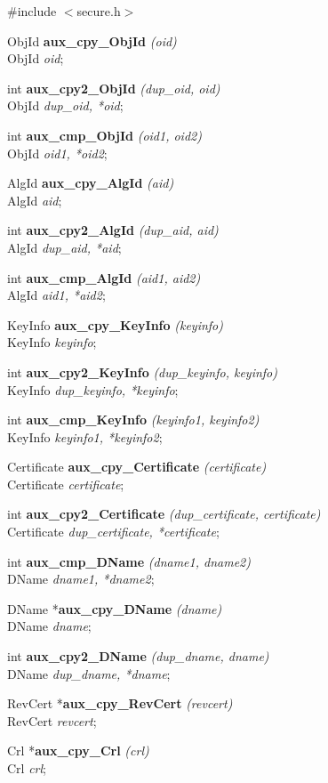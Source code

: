 \#include $<$secure.h$>$
 
ObjId {\bf *aux\_cpy\_ObjId} {\em (oid)} \\
ObjId {\em *oid};

int {\bf aux\_cpy2\_ObjId} {\em (dup\_oid, oid)} \\
ObjId {\em *dup\_oid, *oid};

int {\bf aux\_cmp\_ObjId} {\em (oid1, oid2)} \\
ObjId {\em *oid1, *oid2};

AlgId {\bf *aux\_cpy\_AlgId} {\em (aid)} \\
AlgId {\em *aid};

int {\bf aux\_cpy2\_AlgId} {\em (dup\_aid, aid)} \\
AlgId {\em *dup\_aid, *aid};

int {\bf aux\_cmp\_AlgId} {\em (aid1, aid2)} \\
AlgId {\em *aid1, *aid2};

KeyInfo {\bf *aux\_cpy\_KeyInfo} {\em (keyinfo)} \\
KeyInfo {\em *keyinfo};

int {\bf aux\_cpy2\_KeyInfo} {\em (dup\_keyinfo, keyinfo)} \\
KeyInfo {\em *dup\_keyinfo, *keyinfo};

int {\bf aux\_cmp\_KeyInfo} {\em (keyinfo1, keyinfo2)} \\
KeyInfo {\em *keyinfo1, *keyinfo2};

Certificate {\bf *aux\_cpy\_Certificate} {\em (certificate)} \\
Certificate {\em *certificate};

int {\bf aux\_cpy2\_Certificate} {\em (dup\_certificate, certificate)} \\
Certificate {\em *dup\_certificate, *certificate};

int {\bf aux\_cmp\_DName} {\em  (dname1, dname2)} \\
DName {\em *dname1, *dname2};

DName *{\bf aux\_cpy\_DName} {\em  (dname)} \\
DName {\em *dname};

int {\bf aux\_cpy2\_DName} {\em (dup\_dname, dname)} \\
DName {\em *dup\_dname, *dname};

RevCert *{\bf aux\_cpy\_RevCert} {\em  (revcert)} \\
RevCert {\em *revcert};

Crl *{\bf aux\_cpy\_Crl} {\em  (crl)} \\
Crl {\em *crl};

